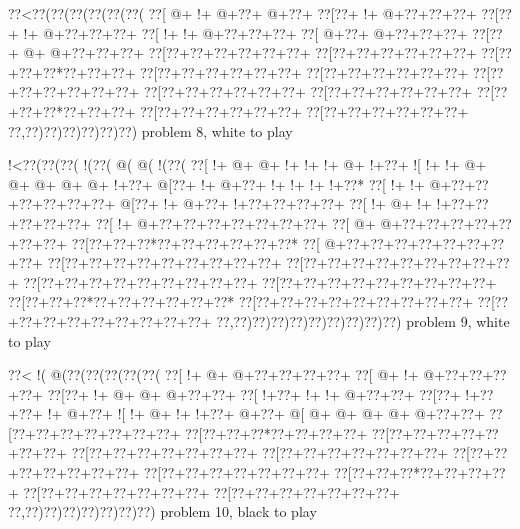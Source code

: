 \vbox{\vbox{\goo
\0??<\0??(\0??(\0??(\0??(\0??(\0??(
\0??[\- @+\- !+\- @+\0??+\- @+\0??+
\0??[\0??+\- !+\- @+\0??+\0??+\0??+
\0??[\0??+\- !+\- @+\0??+\0??+\0??+
\0??[\- !+\- !+\- @+\0??+\0??+\0??+
\0??[\- @+\0??+\- @+\0??+\0??+\0??+
\0??[\0??+\- @+\- @+\0??+\0??+\0??+
\0??[\0??+\0??+\0??+\0??+\0??+\0??+
\0??[\0??+\0??+\0??+\0??+\0??+\0??+
\0??[\0??+\0??+\0??*\0??+\0??+\0??+
\0??[\0??+\0??+\0??+\0??+\0??+\0??+
\0??[\0??+\0??+\0??+\0??+\0??+\0??+
\0??[\0??+\0??+\0??+\0??+\0??+\0??+
\0??[\0??+\0??+\0??+\0??+\0??+\0??+
\0??[\0??+\0??+\0??+\0??+\0??+\0??+
\0??[\0??+\0??+\0??*\0??+\0??+\0??+
\0??[\0??+\0??+\0??+\0??+\0??+\0??+
\0??[\0??+\0??+\0??+\0??+\0??+\0??+
\0??,\0??)\0??)\0??)\0??)\0??)\0??)
}
\hfil problem 8, white to play\hfil\break
}

\vbox{\vbox{\goo
\- !<\0??(\0??(\0??(\- !(\0??(\- @(\- @(\- !(\0??(
\0??[\- !+\- @+\- @+\- !+\- !+\- !+\- @+\- !+\0??+
\- ![\- !+\- !+\- @+\- @+\- @+\- @+\- @+\- !+\0??+
\- @[\0??+\- !+\- @+\0??+\- !+\- !+\- !+\- !+\0??*
\0??[\- !+\- !+\- @+\0??+\0??+\0??+\0??+\0??+\0??+
\- @[\0??+\- !+\- @+\0??+\- !+\0??+\0??+\0??+\0??+
\0??[\- !+\- @+\- !+\- !+\0??+\0??+\0??+\0??+\0??+
\0??[\- !+\- @+\0??+\0??+\0??+\0??+\0??+\0??+\0??+
\0??[\- @+\- @+\0??+\0??+\0??+\0??+\0??+\0??+\0??+
\0??[\0??+\0??+\0??*\0??+\0??+\0??+\0??+\0??+\0??*
\0??[\- @+\0??+\0??+\0??+\0??+\0??+\0??+\0??+\0??+
\0??[\0??+\0??+\0??+\0??+\0??+\0??+\0??+\0??+\0??+
\0??[\0??+\0??+\0??+\0??+\0??+\0??+\0??+\0??+\0??+
\0??[\0??+\0??+\0??+\0??+\0??+\0??+\0??+\0??+\0??+
\0??[\0??+\0??+\0??+\0??+\0??+\0??+\0??+\0??+\0??+
\0??[\0??+\0??+\0??*\0??+\0??+\0??+\0??+\0??+\0??*
\0??[\0??+\0??+\0??+\0??+\0??+\0??+\0??+\0??+\0??+
\0??[\0??+\0??+\0??+\0??+\0??+\0??+\0??+\0??+\0??+
\0??,\0??)\0??)\0??)\0??)\0??)\0??)\0??)\0??)\0??)
}
\hfil problem 9, white to play\hfil\break
}

\vbox{\vbox{\goo
\0??<\- !(\- @(\0??(\0??(\0??(\0??(\0??(
\0??[\- !+\- @+\- @+\0??+\0??+\0??+\0??+
\0??[\- @+\- !+\- @+\0??+\0??+\0??+\0??+
\0??[\0??+\- !+\- @+\- @+\- @+\0??+\0??+
\0??[\- !+\0??+\- !+\- !+\- @+\0??+\0??+
\0??[\0??+\- !+\0??+\0??+\- !+\- @+\0??+
\- ![\- !+\- @+\- !+\- !+\0??+\- @+\0??+
\- @[\- @+\- @+\- @+\- @+\- @+\0??+\0??+
\0??[\0??+\0??+\0??+\0??+\0??+\0??+\0??+
\0??[\0??+\0??+\0??*\0??+\0??+\0??+\0??+
\0??[\0??+\0??+\0??+\0??+\0??+\0??+\0??+
\0??[\0??+\0??+\0??+\0??+\0??+\0??+\0??+
\0??[\0??+\0??+\0??+\0??+\0??+\0??+\0??+
\0??[\0??+\0??+\0??+\0??+\0??+\0??+\0??+
\0??[\0??+\0??+\0??+\0??+\0??+\0??+\0??+
\0??[\0??+\0??+\0??*\0??+\0??+\0??+\0??+
\0??[\0??+\0??+\0??+\0??+\0??+\0??+\0??+
\0??[\0??+\0??+\0??+\0??+\0??+\0??+\0??+
\0??,\0??)\0??)\0??)\0??)\0??)\0??)\0??)
}
\hfil problem 10, black to play\hfil\break
}


